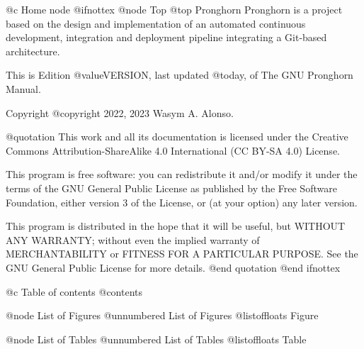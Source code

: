 @c Home node
@ifnottex
@node Top
@top Pronghorn
Pronghorn is a project based on the design and implementation of an automated continuous development, integration and deployment pipeline integrating a Git-based architecture.

This is Edition @value{VERSION}, last updated @today{}, of The GNU Pronghorn Manual.

Copyright @copyright{} 2022, 2023 Wasym A. Alonso.

@quotation
This work and all its documentation is licensed under the Creative Commons Attribution-ShareAlike 4.0 International (CC BY-SA 4.0) License.

This program is free software: you can redistribute it and/or modify it under the terms of the GNU General Public License as published by the Free Software Foundation, either version 3 of the License, or (at your option) any later version.

This program is distributed in the hope that it will be useful, but WITHOUT ANY WARRANTY; without even the implied warranty of MERCHANTABILITY or FITNESS FOR A PARTICULAR PURPOSE. See the GNU General Public License for more details.
@end quotation
@end ifnottex

@c Table of contents
@contents

@node List of Figures
@unnumbered List of Figures
@listoffloats Figure

@node List of Tables
@unnumbered List of Tables
@listoffloats Table
